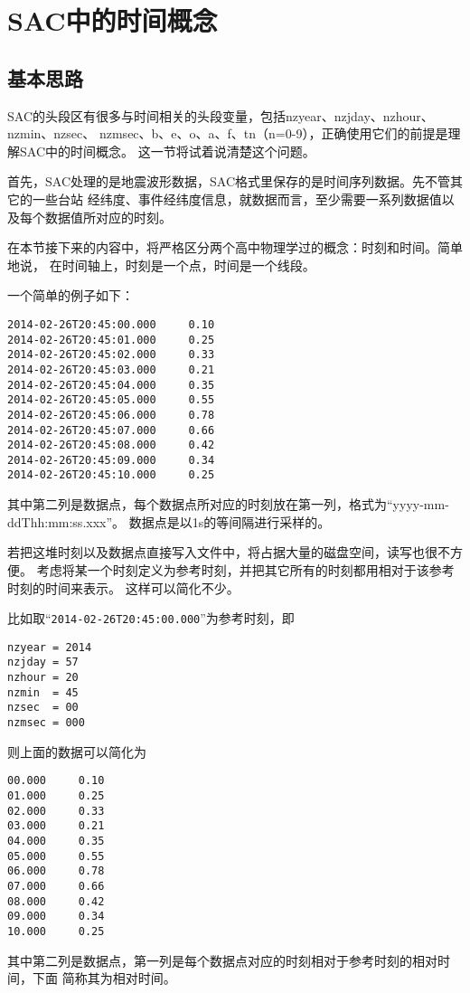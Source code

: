 \section{SAC中的时间概念}
\label{sec:sac-time}

\subsection{基本思路}
SAC的头段区有很多与时间相关的头段变量，包括nzyear、nzjday、nzhour、nzmin、nzsec、
nzmsec、b、e、o、a、f、tn（n=0-9），正确使用它们的前提是理解SAC中的时间概念。
这一节将试着说清楚这个问题。

首先，SAC处理的是地震波形数据，SAC格式里保存的是时间序列数据。先不管其它的一些台站
经纬度、事件经纬度信息，就数据而言，至少需要一系列数据值以及每个数据值所对应的时刻。

在本节接下来的内容中，将严格区分两个高中物理学过的概念：时刻和时间。简单地说，
在时间轴上，时刻是一个点，时间是一个线段。

一个简单的例子如下：
\begin{lstlisting}[style=Bash]
2014-02-26T20:45:00.000     0.10
2014-02-26T20:45:01.000     0.25
2014-02-26T20:45:02.000     0.33
2014-02-26T20:45:03.000     0.21
2014-02-26T20:45:04.000     0.35
2014-02-26T20:45:05.000     0.55
2014-02-26T20:45:06.000     0.78
2014-02-26T20:45:07.000     0.66
2014-02-26T20:45:08.000     0.42
2014-02-26T20:45:09.000     0.34
2014-02-26T20:45:10.000     0.25
\end{lstlisting}
其中第二列是数据点，每个数据点所对应的时刻放在第一列，格式为``yyyy-mm-ddThh:mm:ss.xxx''。
数据点是以1s的等间隔进行采样的。

若把这堆时刻以及数据点直接写入文件中，将占据大量的磁盘空间，读写也很不方便。
考虑将某一个时刻定义为参考时刻，并把其它所有的时刻都用相对于该参考时刻的时间来表示。
这样可以简化不少。

比如取``\lstinline{2014-02-26T20:45:00.000}''为参考时刻，即
\begin{lstlisting}[style=Bash]
nzyear = 2014
nzjday = 57
nzhour = 20
nzmin  = 45
nzsec  = 00
nzmsec = 000
\end{lstlisting}
则上面的数据可以简化为
\begin{lstlisting}[style=Bash]
00.000     0.10
01.000     0.25
02.000     0.33
03.000     0.21
04.000     0.35
05.000     0.55
06.000     0.78
07.000     0.66
08.000     0.42
09.000     0.34
10.000     0.25
\end{lstlisting}
其中第二列是数据点，第一列是每个数据点对应的时刻相对于参考时刻的相对时间，下面
简称其为相对时间。

